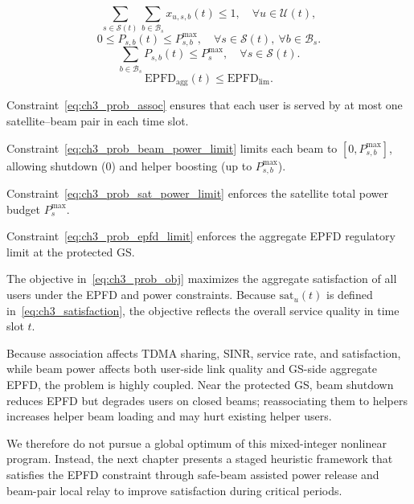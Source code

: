 \begin{equation}
\sum_{s\in\mathcal{S}(t)}\sum_{b\in\mathcal{B}_s} x_{u,s,b}(t)\le 1,
\quad \forall u\in\mathcal{U}(t),
\label{eq:ch3_prob_assoc}
\end{equation}
\begin{equation}
0\le P_{s,b}(t)\le P_{s,b}^{\max},
\quad \forall s\in\mathcal{S}(t),\ \forall b\in\mathcal{B}_s.
\label{eq:ch3_prob_beam_power_limit}
\end{equation}
\begin{equation}
\sum_{b\in\mathcal{B}_s} P_{s,b}(t)\le P_s^{\max},
\quad \forall s\in\mathcal{S}(t).
\label{eq:ch3_prob_sat_power_limit}
\end{equation}
\begin{equation}
\mathrm{EPFD}_{\mathrm{agg}}(t)\le \mathrm{EPFD}_{\mathrm{lim}}.
\label{eq:ch3_prob_epfd_limit}
\end{equation}

Constraint~\eqref{eq:ch3_prob_assoc} ensures that each user is served by at most one satellite--beam pair in each time slot.

Constraint~\eqref{eq:ch3_prob_beam_power_limit} limits each beam to $[0,P_{s,b}^{\max}]$, allowing shutdown ($0$) and helper boosting (up to $P_{s,b}^{\max}$).

Constraint~\eqref{eq:ch3_prob_sat_power_limit} enforces the satellite total power budget $P_s^{\max}$.

Constraint~\eqref{eq:ch3_prob_epfd_limit} enforces the aggregate EPFD regulatory limit at the protected GS.

The objective in~\eqref{eq:ch3_prob_obj} maximizes the aggregate satisfaction of all users under the EPFD and power constraints. Because $\mathrm{sat}_u(t)$ is defined in~\eqref{eq:ch3_satisfaction}, the objective reflects the overall service quality in time slot $t$.

Because association affects TDMA sharing, SINR, service rate, and satisfaction, while beam power affects both user-side link quality and GS-side aggregate EPFD, the problem is highly coupled. Near the protected GS, beam shutdown reduces EPFD but degrades users on closed beams; reassociating them to helpers increases helper beam loading and may hurt existing helper users.

We therefore do not pursue a global optimum of this mixed-integer nonlinear program. Instead, the next chapter presents a staged heuristic framework that satisfies the EPFD constraint through safe-beam assisted power release and beam-pair local relay to improve satisfaction during critical periods.
